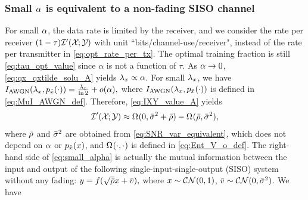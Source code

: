 \documentclass[12pt, draftclsnofoot,journal,onecolumn]{IEEEtran}
\begin{document}
\subsubsection{Small $\alpha$ is equivalent to a non-fading SISO channel}
\label{subsec:small_ratio_Ropt}
For small $\alpha$, the data rate is limited by the receiver, and we consider the rate per receiver
$(1-\tau)\mathcal{I}{'}({\mathcal{X}}_{};{\mathcal{Y}}_{})$ 
with unit ``bits/channel-use/receiver", instead of the rate per transmitter %
in \eqref{eq:opt_rate_per_tx}.
The optimal training fraction is still \eqref{eq:tau_opt_value} since $\alpha$ is not a function of $\tau$.  As $\alpha\to 0$,  \eqref{eq:qx_qxtilde_solu_A} yields $\lambda_x\propto\alpha$.
For small $\lambda_x$, we have $I_{\rm AWGN}(\lambda_x,p_{\tilde{x}}(\cdot))= \frac{\lambda_x}{\ln 2}+o(\alpha),$
where $I_{\rm AWGN}(\lambda_x,p_{\tilde{x}}(\cdot))$ is defined in \eqref{eq:MuI_AWGN_def}.
Therefore, \eqref{eq:IXY_value_A} yields
\begin{align}
    \cIInn{\txA}{\rxA}{} \approx \Enta[](0,\varnsequ+\snrequ) - \Enta[]({\snrequ},\varnsequ),
    \label{eq:small_alpha}
\end{align}
where $\bar{\rho}$ and $\bar{\sigma}_{}^2$ are obtained from \eqref{eq:SNR_var_equivalent}, which does not depend on $\alpha$ or $p_{\tilde{x}}(x)$, and $\Enta[](\cdot,\cdot)$ is defined in \eqref{eq:Ent_V_o_def}. The right-hand side of \eqref{eq:small_alpha} is actually the mutual information between the input and output of the following single-input-single-output (SISO) system without any fading: $y=f(\sqrt{\bar{\rho}}x+\bar{v}),$
where $x\sim\mathcal{C}\mathcal{N}(0,1)$, $\bar{v}\sim\mathcal{C}\mathcal{N}(0,\bar{\sigma}_{}^2)$.  We have
\end{document}
